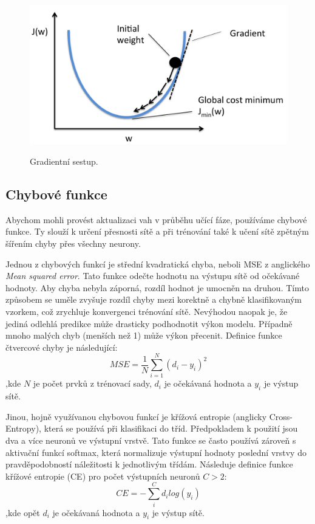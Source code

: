 \begin{figure}[h]\centering
    \centering
    \includegraphics[width=0.7\linewidth]{obrazky/GradientDescent.png}\\[1pt]  
    \caption{Gradientní sestup. \cite{Raschka_GradientDescent}}    
    \label{obrazekGradientDescent}
\end{figure}

\subsection{Chybové funkce}
Abychom mohli provést aktualizaci vah v průběhu učící fáze,
používáme chybové funkce.
Ty slouží k určení přesnosti sítě
a při trénování také k učení sítě zpětným šířením chyby přes všechny neurony.
\par
Jednou z chybových funkcí je střední kvadratická chyba,
neboli MSE z anglického \emph{Mean squared error}.
Tato funkce odečte hodnotu na výstupu sítě od očekávané hodnoty.
Aby chyba nebyla záporná, rozdíl hodnot je umocněn na druhou.
Tímto způsobem se uměle zvyšuje rozdíl chyby mezi korektně
a chybně klasifikovaným vzorkem,
což zrychluje konvergenci trénování sítě.
Nevýhodou naopak je, že jediná odlehlá predikce 
může drasticky podhodnotit výkon modelu.
Případně mnoho malých chyb (menších než 1) může výkon přecenit.
Definice funkce čtvercové chyby je následující:
\begin{equation}
    MSE = \frac{1}{N} \sum^{N}_{i=1}(d_i - y_i)^2 
\end{equation}
,kde $N$ je počet prvků z trénovací sady, $d_i$ je očekávaná hodnota a $y_i$ je výstup sítě.
\par

Jinou, hojně využívanou chybovou funkcí je křížová entropie
(anglicky Cross-Entropy),
která se používá při klasifikaci do tříd.
Předpokladem k použití jsou dva a více neuronů ve výstupní vrstvě.
Tato funkce se často používá zároveň s aktivační funkcí softmax,
která normalizuje výstupní hodnoty poslední vrstvy 
do pravděpodobností náležitosti k jednotlivým třídám.
Následuje definice funkce křížové entropie (CE) pro počet výstupních neuronů $C > 2$:
\begin{equation}
    CE = - \sum^C_i d_i log(y_i)
\end{equation}
,kde opět $d_i$ je očekávaná hodnota a $y_i$ je výstup sítě.
\par


